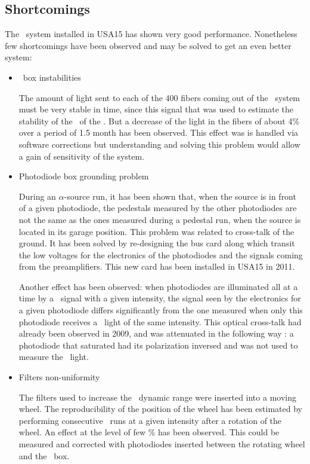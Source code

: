 \subsection{Shortcomings}
The \las~system installed in USA15 has shown very good performance. Nonetheless few shortcomings have been observed and may be solved to get an even better system:
\begin{itemize}
\item{\coimbra~box instabilities} 
	
The amount of light sent to each of the 400 fibers coming out of the \coimbra~system must be very stable in time, since this signal that was used to estimate the stability of the \pmts~of the \tilecal. But a decrease of the light in the fibers of about 4\% over a period of 1.5 month has been observed. This effect was is handled via software corrections but understanding and solving this problem would allow a gain of sensitivity of the system.
	
\item{Photodiode box grounding problem} 
	
During an $\alpha$-source run, it has been shown that, when the source is in front of a given photodiode, the pedestals measured by the other photodiodes are not the same as the ones measured during a pedestal run, when the source is located in its garage position. This problem was related to cross-talk of the ground. It has been solved by re-designing the bus card along which transit the low voltages for the electronics of the photodiodes and the signals coming from the preamplifiers. This new card has been installed in USA15 in 2011. \par
Another effect has been observed: when photodiodes are illuminated all at a time by a \las~signal with a given intensity, the signal seen by the electronics for a given photodiode differs significantly from the one measured when only this photodiode receives a \las~light of the same intensity. This optical cross-talk had already been observed in 2009, and was attenuated in the following way : a photodiode that saturated had its polarization inversed and was not used to measure the  \las~light. 
		
\item{Filters non-uniformity}
	
The filters used to increase the \las~dynamic range were inserted into a moving wheel. The reproducibility of the position of the wheel has been estimated by performing consecutive \las~runs at a given intensity after a rotation of the wheel. An effect at the level of few \% has been observed. This could be measured and corrected with photodiodes inserted between the rotating wheel and the \coimbra~box.
	

\end{itemize}
